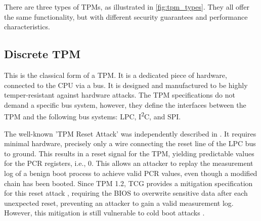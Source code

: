 

There are three types of TPMs, as illustrated in \autoref{fig:tpm_types}. They all offer the same functionality, but with different security guarantees and performance characteristics.

\subsection{Discrete TPM}

This is the classical form of a TPM. It is a dedicated piece of hardware, connected to the CPU via a bus. It is designed and manufactured to be highly temper-resistant against hardware attacks.
The TPM specifications \cite{tpm, tcgPcClient} do not demand a specific bus system, however, they define the interfaces between the TPM and the following bus systems: LPC, I\textsuperscript{2}C, and SPI.

The well-known 'TPM Reset Attack' was independently described in \cite{kauerBernhard,sparks2007}. It requires minimal hardware, precisely only a wire connecting the reset line of the LPC bus \cite{lpc} to ground. This results in a reset signal for the TPM, yielding predictable values for the \ac{PCR} registers, i.e., 0. This allows an attacker to replay the measurement log of a benign boot process to achieve valid \ac{PCR} values, even though a modified chain has been booted.
Since TPM 1.2, TCG provides a mitigation specification for this reset attack \cite{tcgResetFix}, requiring the BIOS to overwrite sensitive data after each unexpected reset, preventing an attacker to gain a valid measurement log.
However, this mitigation is still vulnerable to cold boot attacks \cite{Halderman2009, Winter2013}.

